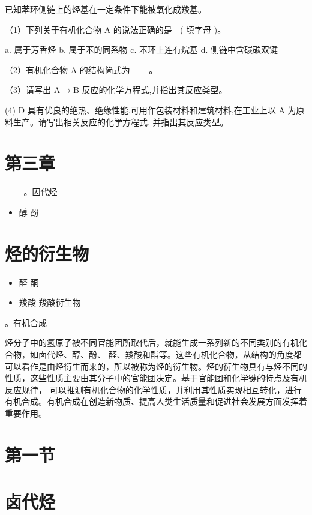\documentclass[10pt]{article}
\begin{document}
已知苯环侧链上的烃基在一定条件下能被氧化成羧基。

（1）下列关于有机化合物 \(\mathrm{A}\) 的说法正确的是 \(\;\) ( 填字母 )。

a. 属于芳香烃 b. 属于苯的同系物 c. 苯环上连有烷基 d. 侧链中含碳碳双键

（2）有机化合物 A 的结构简式为\_\_\_。

（3）请写出 \(\mathrm{A} \rightarrow \mathrm{B}\) 反应的化学方程式,并指出其反应类型。

(4) \(\mathrm{D}\) 具有优良的绝热、绝缘性能,可用作包装材料和建筑材料,在工业上以 \(\mathrm{A}\) 为原料生产。请写出相关反应的化学方程式, 并指出其反应类型。

\section*{第三章}

\_\_\_。因代烃

\begin{itemize}
\item 醇 酚
\end{itemize}

\section*{烃的衍生物}

\begin{itemize}
\item 醛 酮
\end{itemize}

\begin{itemize}
\item 羧酸 羧酸衍生物
\end{itemize}

。有机合成

烃分子中的氢原子被不同官能团所取代后，就能生成一系列新的不同类别的有机化合物，如卤代烃、醇、酚、 醛、羧酸和酯等。这些有机化合物，从结构的角度都可以看作是由烃衍生而来的，所以被称为烃的衍生物。烃的衍生物具有与烃不同的性质，这些性质主要由其分子中的官能团决定。基于官能团和化学键的特点及有机反应规律， 可以推测有机化合物的化学性质，并利用其性质实现相互转化，进行有机合成。有机合成在创造新物质、提高人类生活质量和促进社会发展方面发挥着重要作用。

\section*{第一节}

\section*{卤代烃}
\end{document}

